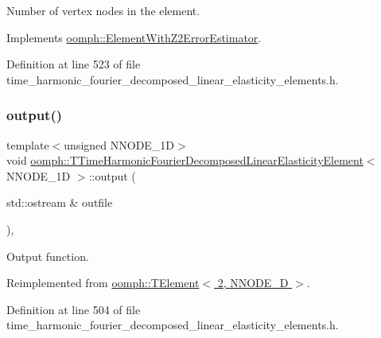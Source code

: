 Number of vertex nodes in the element. 



Implements \hyperlink{classoomph_1_1ElementWithZ2ErrorEstimator_a19495a0e77ef4ff35f15fdf7913b4077}{oomph\+::\+Element\+With\+Z2\+Error\+Estimator}.



Definition at line 523 of file time\+\_\+harmonic\+\_\+fourier\+\_\+decomposed\+\_\+linear\+\_\+elasticity\+\_\+elements.\+h.

\mbox{\label{classoomph_1_1TTimeHarmonicFourierDecomposedLinearElasticityElement_ae14527add57636a4412ea584dd66cdbe}} 
\subsubsection{\texorpdfstring{output()}{output()}\hspace{0.1cm}{\footnotesize\ttfamily [1/4]}}
{\footnotesize\ttfamily template$<$unsigned N\+N\+O\+D\+E\+\_\+1D$>$ \\
void \hyperlink{classoomph_1_1TTimeHarmonicFourierDecomposedLinearElasticityElement}{oomph\+::\+T\+Time\+Harmonic\+Fourier\+Decomposed\+Linear\+Elasticity\+Element}$<$ N\+N\+O\+D\+E\+\_\+1D $>$\+::output (\begin{DoxyParamCaption}\item[{std\+::ostream \&}]{outfile }\end{DoxyParamCaption})\hspace{0.3cm}{\ttfamily [inline]}, {\ttfamily [virtual]}}



Output function. 



Reimplemented from \hyperlink{classoomph_1_1TElement_3_012_00_01NNODE__1D_01_4_ad66ccbcca9ee2a4eb3c24bdd21c096f9}{oomph\+::\+T\+Element$<$ 2, N\+N\+O\+D\+E\+\_\+D $>$}.



Definition at line 504 of file time\+\_\+harmonic\+\_\+fourier\+\_\+decomposed\+\_\+linear\+\_\+elasticity\+\_\+elements.\+h.



